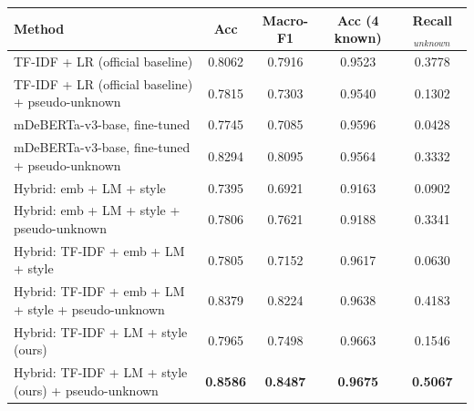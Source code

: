\begin{tabular}{|l|cccc|}
\hline
Method & Acc & Macro-F1 & Acc (4 known) & Recall$_{unknown}$ \\
\hline
TF-IDF + LR (official baseline) & 0.8062 & 0.7916 & 0.9523 & 0.3778 \\
TF-IDF + LR (official baseline) + pseudo-unknown & 0.7815 & 0.7303 & 0.9540 & 0.1302 \\
mDeBERTa-v3-base, fine-tuned & 0.7745 & 0.7085 & 0.9596 & 0.0428 \\
mDeBERTa-v3-base, fine-tuned + pseudo-unknown & 0.8294 & 0.8095 & 0.9564 & 0.3332 \\
Hybrid: emb + LM + style & 0.7395 & 0.6921 & 0.9163 & 0.0902 \\
Hybrid: emb + LM + style + pseudo-unknown & 0.7806 & 0.7621 & 0.9188 & 0.3341 \\
Hybrid: TF-IDF + emb + LM + style & 0.7805 & 0.7152 & 0.9617 & 0.0630 \\
Hybrid: TF-IDF + emb + LM + style + pseudo-unknown & 0.8379 & 0.8224 & 0.9638 & 0.4183 \\
Hybrid: TF-IDF + LM + style (ours) & 0.7965 & 0.7498 & 0.9663 & 0.1546 \\
Hybrid: TF-IDF + LM + style (ours) + pseudo-unknown & \textbf{0.8586} & \textbf{0.8487} & \textbf{0.9675} & \textbf{0.5067} \\
\hline
\end{tabular}
